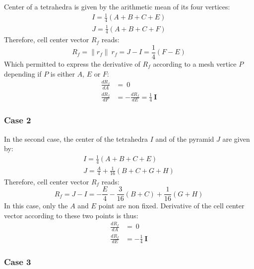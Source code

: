 \documentclass[11pt]{article}
\begin{document}
Center of a tetrahedra is given by the arithmetic mean of its four vertices:
\begin{subequations}
\begin{gather}
I = \frac{1}{4} (A + B + C + E) \\
J = \frac{1}{4} (A + B + C + F)
\end{gather}
\end{subequations} 
Therefore, cell center vector $R_f$ reads:
\begin{equation}
R_f = \| r_f \|\ r_f = J-I = \frac{1}{4} (F - E)
\end{equation}
Which permitted to express the derivative of $R_f$ according to a mesh vertice $P$ depending if $P$ is either $A$, $E$ or $F$:
\begin{subequations}
\begin{align}
\frac{d R_f}{d A} &= \ 0 \\
\frac{d R_f}{d F} &= - \frac{d R_f}{d E} = \frac{1}{4}\ \boldsymbol{I}
\end{align}
\end{subequations} 

\subsubsection*{Case 2}

In the second case, the center of the tetrahedra $I$ and of the pyramid $J$ are given by:
\begin{subequations}
\begin{gather}
I = \frac{1}{4} (A + B + C + E) \\
J = \frac{A}{4} + \frac{1}{16} (B + C + G + H)
\end{gather}
\end{subequations} 
Therefore, cell center vector $R_f$ reads:
\begin{equation}
R_f = J-I = -\frac{E}{4} - \frac{3}{16} (B + C) + \frac{1}{16} ( G + H)
\end{equation}
In this case, only the $A$ and $E$ point are non fixed. Derivative of the cell center vector according to these two points is thus:
\begin{subequations}
\begin{align}
\frac{d R_f}{d A} &= \ 0 \\
\frac{d R_f}{d E} &= - \frac{1}{4}\ \boldsymbol{I}
\end{align}
\end{subequations}


\subsubsection*{Case 3}
\end{document}
